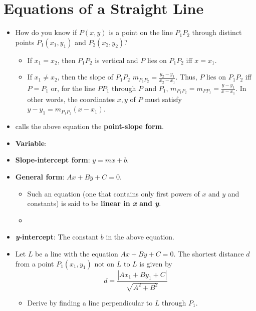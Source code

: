 \documentclass[../main.tex]{subfiles}
\begin{document}
\section{Equations of a Straight Line}
\begin{itemize}
    \item {}How do you know if $P(x,y)$ is a point on the line $P_1P_2$ through distinct points $P_1(x_1,y_1)$ and $P_2(x_2,y_2)$?
    \begin{itemize}
        \item If $x_1=x_2$, then $P_1P_2$ is vertical and $P$ lies on $P_1P_2$ iff $x=x_1$.
        \item If $x_1\neq x_2$, then the slope of $P_1P_2$ $m_{P_1P_2}=\frac{y_2-y_1}{x_2-x_1}$. Thus, $P$ lies on $P_1P_2$ iff $P=P_1$ or, for the line $PP_1$ through $P$ and $P_1$, $m_{P_1P_2}=m_{PP_1}=\frac{y-y_1}{x-x_1}$. In other words, the coordinates $x,y$ of $P$ must satisfy $y-y_1=m_{P_1P_2}(x-x_1)$.
    \end{itemize}
    \item \textcite{bib:Thomas} calls the above equation the \textbf{point-slope form}.
    \item \textbf{Variable}: 
    \item \textbf{Slope-intercept form}: $y=mx+b$.
    \item \textbf{General form}: $Ax+By+C=0$.
    \begin{itemize}
        \item Such an equation (one that contains only first powers of $x$ and $y$ and constants) is said to be \textbf{linear in \emph{x} and \emph{y}}.
        \item {}
    \end{itemize}
    \item \textbf{\emph{y}-intercept}: The constant $b$ in the above equation.
    \item Let $L$ be a line with the equation $Ax+By+C=0$. The shortest distance $d$ from a point $P_1(x_1,y_1)$ not on $L$ to $L$ is given by
    \begin{equation*}
        d = \frac{|Ax_1+By_1+C|}{\sqrt{A^2+B^2}}
    \end{equation*}
    \begin{itemize}
        \item Derive by finding a line perpendicular to $L$ through $P_1$.
    \end{itemize}
\end{itemize}
\end{document}
